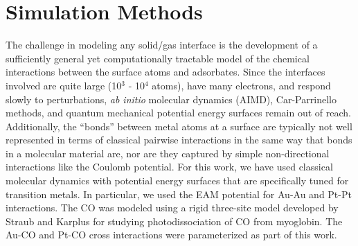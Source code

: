 \documentclass[journal = jpccck, manuscript = article]{achemso}
\begin{document}

\section{Simulation Methods}
The challenge in modeling any solid/gas interface is the development
of a sufficiently general yet computationally tractable model of the
chemical interactions between the surface atoms and adsorbates.  Since
the interfaces involved are quite large (10$^3$ - 10$^4$ atoms), have
many electrons, and respond slowly to perturbations, {\it ab initio}
molecular dynamics
(AIMD),\cite{KRESSE:1993ve,KRESSE:1993qf,KRESSE:1994ul} Car-Parrinello
methods,\cite{CAR:1985bh,Izvekov:2000fv,Guidelli:2000fy} and quantum
mechanical potential energy surfaces remain out of reach.
Additionally, the ``bonds'' between metal atoms at a surface are
typically not well represented in terms of classical pairwise
interactions in the same way that bonds in a molecular material are,
nor are they captured by simple non-directional interactions like the
Coulomb potential.  For this work, we have used classical molecular
dynamics with potential energy surfaces that are specifically tuned
for transition metals.  In particular, we used the EAM potential for
Au-Au and Pt-Pt interactions.\cite{Foiles86} The CO was modeled using
a rigid three-site model developed by Straub and Karplus for studying
photodissociation of CO from myoglobin.\cite{Straub} The Au-CO and
Pt-CO cross interactions were parameterized as part of this work.
  
\end{document}
